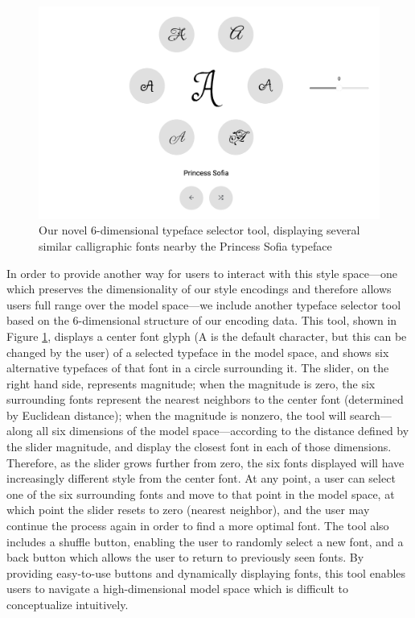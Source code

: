 \begin{figure}[H]
    \centering
    \includegraphics[width=\textwidth]{images/selector-tool.png}
    \caption{Our novel 6-dimensional typeface selector tool, displaying several similar calligraphic fonts nearby the Princess Sofia typeface}
    \label{fig:selector-tool}
\end{figure}

In order to provide another way for users to interact with this style space—one which preserves the dimensionality of our style encodings and therefore allows users full range over the model space—we include another typeface selector tool based on the 6-dimensional structure of our encoding data. This tool, shown in Figure \ref{fig:selector-tool}, displays a center font glyph (A is the default character, but this can be changed by the user) of a selected typeface in the model space, and shows six alternative typefaces of that font in a circle surrounding it. The slider, on the right hand side, represents magnitude; when the magnitude is zero, the six surrounding fonts represent the nearest neighbors to the center font (determined by Euclidean distance); when the magnitude is nonzero, the tool will search—along all six dimensions of the model space—according to the distance defined by the slider magnitude, and display the closest font in each of those dimensions. Therefore, as the slider grows further from zero, the six fonts displayed will have increasingly different style from the center font. At any point, a user can select one of the six surrounding fonts and move to that point in the model space, at which point the slider resets to zero (nearest neighbor), and the user may continue the process again in order to find a more optimal font. The tool also includes a shuffle button, enabling the user to randomly select a new font, and a back button which allows the user to return to previously seen fonts. By providing easy-to-use buttons and dynamically displaying fonts, this tool enables users to navigate a high-dimensional model space which is difficult to conceptualize intuitively.

